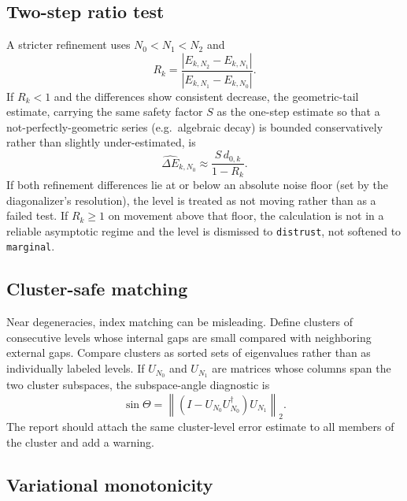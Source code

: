 \documentclass[11pt,a4paper]{article}
\newcommand{\norm}[1]{\left\lVert#1\right\rVert}
\newcommand{\abs}[1]{\left|#1\right|}
\newcommand{\errhat}{\widehat{\Delta E}}
\newcommand{\code}[1]{\texttt{\detokenize{#1}}}
\begin{document}
\subsection{Two-step ratio test}

A stricter refinement uses $N_0<N_1<N_2$ and
\begin{equation}
  R_k=\frac{\abs{E_{k,N_2}-E_{k,N_1}}}{\abs{E_{k,N_1}-E_{k,N_0}}}.
\end{equation}
If $R_k<1$ and the differences show consistent decrease, the geometric-tail estimate, carrying the same safety factor $S$ as the one-step estimate so that a not-perfectly-geometric series (e.g.\ algebraic decay) is bounded conservatively rather than slightly under-estimated, is
\begin{equation}
  \errhat_{k,N_0}\approx \frac{S\,d_{0,k}}{1-R_k}.
\end{equation}
If both refinement differences lie at or below an absolute noise floor (set by the diagonalizer's resolution), the level is treated as not moving rather than as a failed test.  If $R_k\ge 1$ on movement above that floor, the calculation is not in a reliable asymptotic regime and the level is dismissed to \texttt{distrust}, not softened to \texttt{marginal}.

\subsection{Cluster-safe matching}

Near degeneracies, index matching can be misleading.  Define clusters of consecutive levels whose internal gaps are small compared with neighboring external gaps.  Compare clusters as sorted sets of eigenvalues rather than as individually labeled levels.  If $U_{N_0}$ and $U_{N_1}$ are matrices whose columns span the two cluster subspaces, the subspace-angle diagnostic is
\begin{equation}
  \sin\Theta=\norm{(I-U_{N_0}U_{N_0}^\dagger)U_{N_1}}_2.
\end{equation}
The report should attach the same cluster-level error estimate to all members of the cluster and add a \code{cluster_index_ambiguity} warning.

\subsection{Variational monotonicity}
\label{sec:monotonicity}
\end{document}
